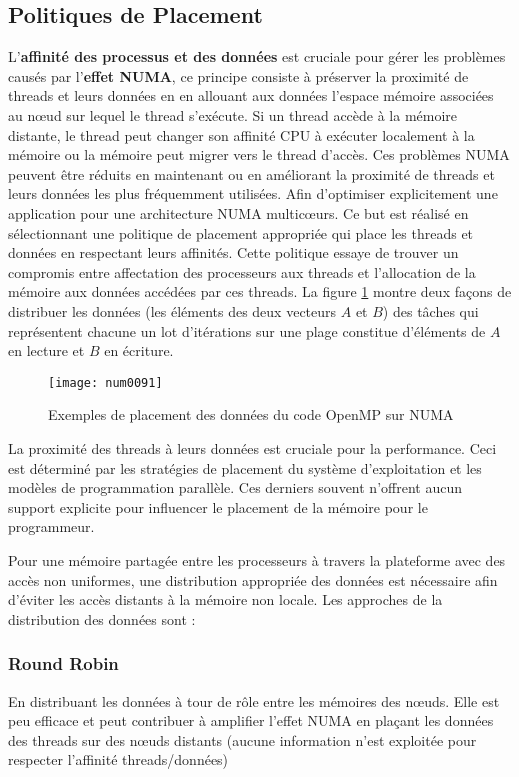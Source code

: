 \subsection{Politiques de Placement}
%
L'\textbf{affinité des processus et des données} est cruciale pour gérer les problèmes causés par l'\textbf{effet NUMA}, 
ce principe consiste à préserver la proximité de threads et leurs données en en allouant aux données l'espace mémoire associées au nœud sur lequel le thread s'exécute. 
Si un thread accède à la mémoire distante, le thread peut changer son affinité CPU à exécuter localement à la mémoire ou la mémoire peut migrer vers le thread d'accès.
Ces problèmes NUMA peuvent être réduits en maintenant ou en améliorant la proximité de threads et leurs données les plus fréquemment utilisées. 
Afin d'optimiser explicitement une application pour une architecture NUMA multicœurs. 
Ce but est réalisé en sélectionnant une politique de placement appropriée qui place les threads et données en respectant leurs affinités. 
Cette politique essaye de trouver un compromis entre affectation des processeurs aux threads et l'allocation de la mémoire aux données accédées par ces threads. 
%
La figure \ref{fig:FG_2_num091} montre deux façons de distribuer les données (les éléments des deux vecteurs $A$ et $B$) des tâches qui représentent chacune un lot d'itérations sur une plage constitue d'éléments de $A$ en lecture et $B$ en écriture.
%
\begin{figure}
\texttt{[image: num0091]}
\centering
\caption{Exemples de placement des données du code OpenMP sur NUMA}
\label{fig:FG_2_num091}
\end{figure}
%
La proximité des threads à leurs données est cruciale pour la performance. 
Ceci est déterminé par les stratégies de placement du système d'exploitation et les modèles de programmation parallèle. Ces derniers souvent n'offrent aucun support explicite pour influencer le placement de la mémoire pour le programmeur.

Pour une mémoire partagée entre les processeurs à travers la plateforme avec des accès non uniformes, une distribution appropriée des données est nécessaire afin d'éviter les accès distants à la mémoire non locale. 
Les approches de la distribution des données sont :
%
\subsubsection{Round Robin}
%
En distribuant les données à tour de rôle entre les mémoires des nœuds. Elle est peu efficace et peut contribuer à amplifier l'effet NUMA en plaçant les données des threads sur des nœuds distants (aucune information n'est exploitée pour respecter l'affinité threads/données)
%
